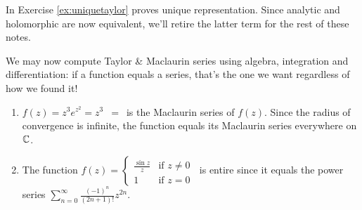 In Exercise \ref{ex:uniquetaylor} proves unique representation. Since analytic and holomorphic are now equivalent, we'll retire the latter term for the rest of these notes. 

\begin{examples}{}{}
	We may now compute Taylor \& Maclaurin series using algebra, integration and differentiation: if a function equals a series, that's the one we want regardless of how we found it!
	\begin{enumerate}
	  \item $f(z)=z^3e^{z^2}=z^3$ \,$\mathrel{=}$\, is the Maclaurin series of $f(z)$. Since the radius of convergence is infinite, the function equals its Maclaurin series everywhere on $\mathbb{C}$.
	  
	  \item The function $f(z)=
	  \begin{cases}
	  	\frac{\sin z}z&\text{if }z\neq 0\\
	  	1&\text{if }z=0
	  \end{cases}\ $
	  is entire since it equals the power series $\sum\limits_{n=0}^\infty\frac{(-1)^n}{(2n+1)!}z^{2n}$.
	  

\end{enumerate}
\end{examples}
